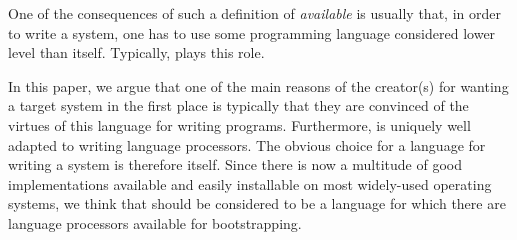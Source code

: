 One of the consequences of such a definition of \emph{available} is
usually that, in order to write a \commonlisp{} system, one has to use
some programming language considered lower level than \commonlisp{}
itself.  Typically, \clanguage{} plays this role.

In this paper, we argue that one of the main reasons of the creator(s)
for wanting a target \commonlisp{} system in the first place is
typically that they are convinced of the virtues of this language for
writing programs.  Furthermore, \commonlisp{} is uniquely well adapted
to writing language processors.  The obvious choice for a language for
writing a \commonlisp{} system is therefore \commonlisp{} itself.
Since there is now a multitude of good \commonlisp{} implementations
available and easily installable on most widely-used operating
systems, we think that \commonlisp{} should be considered to be a
language for which there are language processors available for
bootstrapping.
